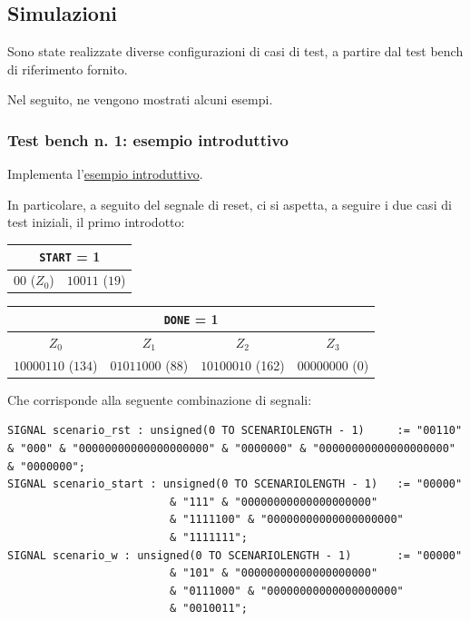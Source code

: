 \documentclass[a4paper,11pt]{article} %
\begin{document}
    \newpage

    \subsection{Simulazioni}\label{subsec:simulazioni}
    Sono state realizzate diverse configurazioni di casi di test, a partire dal test bench di riferimento fornito.

    Nel seguito, ne vengono mostrati alcuni esempi.

    \subsubsection{Test bench n. 1: esempio introduttivo}\label{subsubsec:test-bench-n.-1}
    Implementa l'\hyperref[subsec:un-primo-esempio]{esempio introduttivo}.

    In particolare, a seguito del segnale di reset, ci si aspetta, a seguire i due casi di test iniziali, il primo introdotto:

    \bigskip

    \begin{tabular}{|c|c|}
        \hline
        \multicolumn{2}{|c|}{\texttt{START} = 1} \\
        \hline
        $00$ ($Z_0$) & $10011$ ($19$) \\
        \hline
    \end{tabular}

    \medskip

    \begin{tabular}{|c|c|c|c|}
        \hline
        \multicolumn{4}{|c|}{\texttt{DONE} = 1} \\
        \hline
        $Z_0$              & $Z_1$           & $Z_2$            & $Z_3$          \\
        \hline
        $10000110$ ($134$) & $01011000$ (88) & $10100010$ (162) & $00000000$ (0) \\
        \hline
    \end{tabular}

    \bigskip

    Che corrisponde alla seguente combinazione di segnali:

    \begin{verbatim}
SIGNAL scenario_rst : unsigned(0 TO SCENARIOLENGTH - 1)     := "00110" & "000" & "00000000000000000000" & "0000000" & "00000000000000000000" & "0000000";
SIGNAL scenario_start : unsigned(0 TO SCENARIOLENGTH - 1)   := "00000"
                         & "111" & "00000000000000000000"
                         & "1111100" & "00000000000000000000"
                         & "1111111";
SIGNAL scenario_w : unsigned(0 TO SCENARIOLENGTH - 1)       := "00000"
                         & "101" & "00000000000000000000"
                         & "0111000" & "00000000000000000000"
                         & "0010011";
    \end{verbatim}
\end{document}
